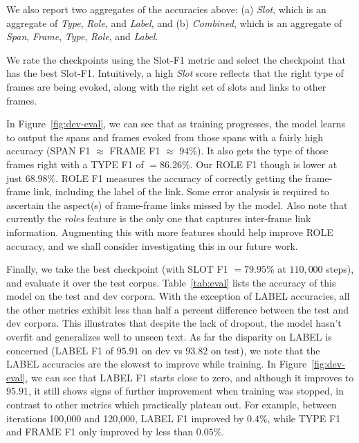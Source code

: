 \documentclass[11pt,a4paper]{article}
\begin{document}
We also report two aggregates of the accuracies above: (a) {\em Slot}, which is
an aggregate of {\em Type}, {\em Role}, and {\em Label}, and (b) {\em Combined},
which is an aggregate of {\em Span}, {\em Frame}, {\em Type}, {\em Role}, and
{\em Label}.

We rate the checkpoints using the Slot-F1 metric and select the checkpoint that
has the best Slot-F1. Intuitively, a high {\em Slot} score reflects that the
right type of frames are being evoked, along with the right set of slots and
links to other frames.

In Figure~\ref{fig:dev-eval}, we can see that as training progresses,
the model learns to output the spans and frames evoked from those spans with
a fairly high accuracy (SPAN F1 $\approx$ FRAME F1 $\approx$ $94\%$). It also
gets the type of those frames right with a TYPE F1 of $= 86.26\%$. Our ROLE F1
though is lower at just $68.98\%$. ROLE F1 measures the accuracy of correctly
getting the frame-frame link, including the label of the link. Some error
analysis is required to ascertain the aspect(s) of frame-frame links missed by
the model. Also note that currently the {\em roles} feature is the only one
that captures inter-frame link information.
Augmenting this with more features should help improve ROLE accuracy, and we
shall consider investigating this in our future work.

Finally, we take the best checkpoint (with SLOT F1 $= 79.95\%$ at $110,000$ steps),
and evaluate it over the test corpus.
Table~\ref{tab:eval} lists the accuracy of this model on the test and dev
corpora.
With the exception of LABEL accuracies, all the other metrics exhibit less than
half a percent difference between the test and dev corpora. This illustrates
that despite the lack of dropout, the model hasn't overfit and generalizes well
to unseen text.
As far the disparity on LABEL is concerned (LABEL F1 of $95.91$ on dev
vs $93.82$ on test), we note that the LABEL accuracies are the slowest to
improve while training.
In Figure~\ref{fig:dev-eval}, we can see that LABEL F1 starts close to zero,
and although it improves to $95.91$, it still shows signs of further improvement
when training was stopped, in contrast to other metrics which practically
plateau out.
For example, between iterations 100,000 and 120,000, LABEL F1 improved by
$0.4\%$, while TYPE F1 and FRAME F1 only improved by less than $0.05\%$.
\end{document}
